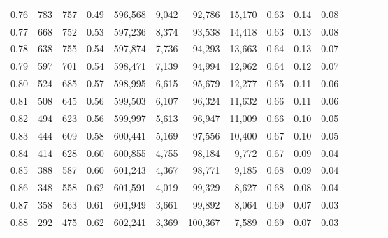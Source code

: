 \begin{tabular}{rrrcrrrrrrrrrrr}
0.76 &     783 &    757 &                                       0.49 &  596,568 &    9,042 &   92,786 &   15,170 &  0.63 &  0.14 &                         0.08 \\
0.77 &     668 &    752 &                                       0.53 &  597,236 &    8,374 &   93,538 &   14,418 &  0.63 &  0.13 &                         0.08 \\
0.78 &     638 &    755 &                                       0.54 &  597,874 &    7,736 &   94,293 &   13,663 &  0.64 &  0.13 &                         0.07 \\
0.79 &     597 &    701 &                                       0.54 &  598,471 &    7,139 &   94,994 &   12,962 &  0.64 &  0.12 &                         0.07 \\
0.80 &     524 &    685 &                                       0.57 &  598,995 &    6,615 &   95,679 &   12,277 &  0.65 &  0.11 &                         0.06 \\
0.81 &     508 &    645 &                                       0.56 &  599,503 &    6,107 &   96,324 &   11,632 &  0.66 &  0.11 &                         0.06 \\
0.82 &     494 &    623 &                                       0.56 &  599,997 &    5,613 &   96,947 &   11,009 &  0.66 &  0.10 &                         0.05 \\
0.83 &     444 &    609 &                                       0.58 &  600,441 &    5,169 &   97,556 &   10,400 &  0.67 &  0.10 &                         0.05 \\
0.84 &     414 &    628 &                                       0.60 &  600,855 &    4,755 &   98,184 &    9,772 &  0.67 &  0.09 &                         0.04 \\
0.85 &     388 &    587 &                                       0.60 &  601,243 &    4,367 &   98,771 &    9,185 &  0.68 &  0.09 &                         0.04 \\
0.86 &     348 &    558 &                                       0.62 &  601,591 &    4,019 &   99,329 &    8,627 &  0.68 &  0.08 &                         0.04 \\
0.87 &     358 &    563 &                                       0.61 &  601,949 &    3,661 &   99,892 &    8,064 &  0.69 &  0.07 &                         0.03 \\
0.88 &     292 &    475 &                                       0.62 &  602,241 &    3,369 &  100,367 &    7,589 &  0.69 &  0.07 &                         0.03 \\

\end{tabular}
